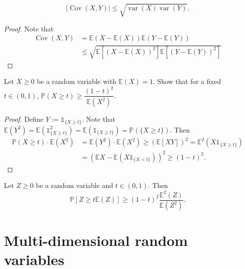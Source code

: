 \documentclass[11pt,singlecolumn, openany, citestyle=authoryear]{elegantbook}
\begin{document}
\begin{CJK}{UTF8}{gbsn}
\begin{corollary}
    \begin{equation}
        |\operatorname{Cov}(X,Y)|\leqslant \sqrt{\operatorname{var}(X)\operatorname{var}(Y)}.
    \end{equation}
\end{corollary}
\begin{proof}
    Note that 
    \begin{align*}
        \operatorname{Cov}(X,Y)&=\mathbb{E}(X-\mathbb{E}(X))\mathbb{E}(Y-\mathbb{E}(Y))\\
        &\leqslant \sqrt{\mathbb{E}[(X-\mathbb{E}(X))^2]\mathbb{E}[(Y-\mathbb{E}(Y))^2]}
    \end{align*}
\end{proof}
\begin{example}
    Let $X\geqslant 0$ be a random variable with $\mathbb{E}(X)=1$. Show that for a fixed 
    $t\in(0,1)$, 
    $\mathbb{P}(X\geqslant t)\geqslant \dfrac{(1-t)^2}{\mathbb{E}(X^2)}$.
\end{example}
\begin{proof}
    Define $Y:=\mathds{1}_{\{X\geqslant t\}}$. 
    Note that $\mathbb{E}(Y^2)=\mathbb{E}(\mathds{1}_{\{X\geqslant t\}}^2)
    =\mathbb{E}(\mathds{1}_{\{X\geqslant t\}})=\mathbb{P}(\{X\geqslant t\})$. Then 
    \begin{align*}
    \mathbb{P}(X\geqslant t)\cdot \mathbb{E}(X^2) &= \mathbb{E}(Y^2)\cdot \mathbb{E}(X^2)
    \geqslant (\mathbb{E}[XY])^2 = \mathbb{E}^2(X\mathds{1}_{\{X\geqslant t\}})\\
    &=(\mathbb{E}X -\mathbb{E}(X\mathds{1}_{\{X< t\}}))^2\geqslant(1-t)^2.
    \end{align*}
\end{proof}
\begin{corollary}
    Let $Z\geqslant 0$ be a random variable and $t\in(0,1)$. Then 
    \begin{equation}
        \mathbb{P}[Z\geqslant t\mathbb{E}(Z)]\geqslant (1-t)^2\frac{\mathbb{E}^2(Z)}{\mathbb{E}(Z^2)}.
    \end{equation}
\end{corollary}

\chapter{Multi-dimensional random variables}

\end{CJK}
\end{document}
